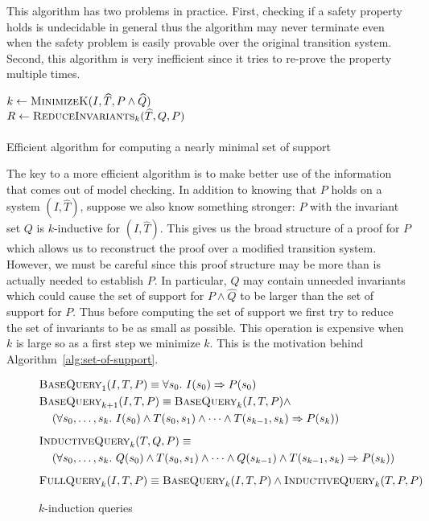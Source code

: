 This algorithm has two problems in practice. First, checking if a
safety property holds is undecidable in general thus the algorithm may
never terminate even when the safety problem is easily provable over
the original transition system. Second, this algorithm is very
inefficient since it tries to re-prove the property multiple times.

\begin{algorithm}[t]
  \BlankLine
  $k \leftarrow \textsc{MinimizeK}(I, \widehat T, P \land \widehat Q)$ \\
  $R \leftarrow \textsc{ReduceInvariants}_k(\widehat T, Q, P)$ \\
  \\
\caption{Efficient algorithm for computing a nearly minimal set of support}
\label{alg:set-of-support}
\end{algorithm}

The key to a more efficient algorithm is to make better use of the
information that comes out of model checking. In addition to knowing
that $P$ holds on a system $(I, \widehat T)$, suppose we also know
something stronger: $P$ with the invariant set $Q$ is $k$-inductive
for $(I, \widehat T)$. This gives us the broad structure of a proof
for $P$ which allows us to reconstruct the proof over a modified
transition system. However, we must be careful since this proof
structure may be more than is actually needed to establish $P$. In
particular, $Q$ may contain unneeded invariants which could cause the
set of support for $P \land \widehat Q$ to be larger than the set of
support for $P$. Thus before computing the set of support we first try
to reduce the set of invariants to be as small as possible. This
operation is expensive when $k$ is large so as a first step we
minimize $k$. This is the motivation behind
Algorithm~\ref{alg:set-of-support}.

\begin{figure}
\begin{align*}
  &\bq_1(I, T, P) \equiv \forall s_0.~ I(s_0) \Rightarrow P(s_0) \\
  &\bq_{k+1}(I, T, P) \equiv \bq_k(I, T, P) \land~ \\
%
  &\hspace{10pt}\left(\forall s_0, \ldots, s_k.~ I(s_0) \land T(s_0,
  s_1) \land \cdots \land T(s_{k-1}, s_k) \Rightarrow P(s_k)\right)
  \\[5pt]
  &\iq_k(T, Q, P) \equiv \\
%
  &\hspace{10pt}\left(\forall s_0, \ldots, s_k.~ Q(s_0) \land T(s_0,
  s_1) \land \cdots \land Q(s_{k-1}) \land T(s_{k-1}, s_k) \Rightarrow
  P(s_k)\right) \\[5pt]
  &\fq_k(I, T, P) \equiv \bq_k(I, T, P) \land \iq_k(T, P, P)
\end{align*}
\caption{$k$-induction queries}
\label{fig:queries}
\end{figure}


